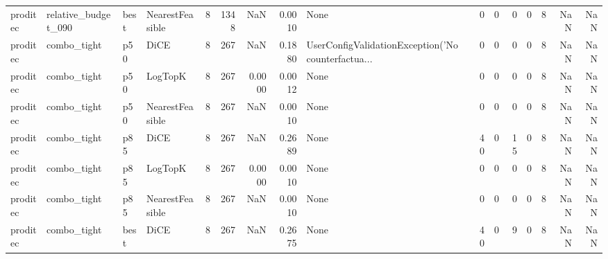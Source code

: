 \begin{tabular}{llllrrrrlrrrrrrr}
proditec &  relative\_budget\_090 &   best & NearestFeasible &            8 &                 1348 &                      NaN &      0.0010 &                                               None &      0 &            0 &        0 &              0 &          8 &                NaN &            NaN \\
proditec &          combo\_tight &    p50 &            DiCE &            8 &                  267 &                      NaN &      0.1880 & UserConfigValidationException('No counterfactua... &      0 &            0 &        0 &              0 &          8 &                NaN &            NaN \\
proditec &          combo\_tight &    p50 &         LogTopK &            8 &                  267 &                   0.0000 &      0.0012 &                                               None &      0 &            0 &        0 &              0 &          8 &                NaN &            NaN \\
proditec &          combo\_tight &    p50 & NearestFeasible &            8 &                  267 &                      NaN &      0.0010 &                                               None &      0 &            0 &        0 &              0 &          8 &                NaN &            NaN \\
proditec &          combo\_tight &    p85 &            DiCE &            8 &                  267 &                      NaN &      0.2689 &                                               None &     40 &            0 &       15 &              0 &          8 &                NaN &            NaN \\
proditec &          combo\_tight &    p85 &         LogTopK &            8 &                  267 &                   0.0000 &      0.0010 &                                               None &      0 &            0 &        0 &              0 &          8 &                NaN &            NaN \\
proditec &          combo\_tight &    p85 & NearestFeasible &            8 &                  267 &                      NaN &      0.0010 &                                               None &      0 &            0 &        0 &              0 &          8 &                NaN &            NaN \\
proditec &          combo\_tight &   best &            DiCE &            8 &                  267 &                      NaN &      0.2675 &                                               None &     40 &            0 &        9 &              0 &          8 &                NaN &            NaN \\

\end{tabular}
